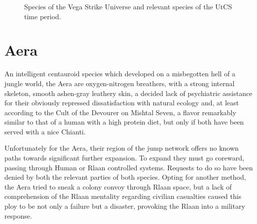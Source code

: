 \label{appendix:Species}

\begin{figure} \begin{center}
    \caption{Species of the Vega Strike Universe and relevant species of the UtCS time period.}
    \label{fig:vs-species}
\end{center} \end{figure}


\section{Aera}

 An intelligent centauroid species which developed on a misbegotten
hell of a jungle world, the Aera are oxygen-nitrogen breathers, with a
strong internal skeleton, smooth ashen-gray leathery skin, a decided
lack of psychiatric assistance for their obviously repressed
dissatisfaction with natural ecology and, at least according to the
Cult of the Devourer on Mishtal Seven, a flavor remarkably similar to
that of a human with a high protein diet, but only if both have been
served with a nice Chianti.

Unfortunately for the Aera, their region of the jump network offers no
known paths towards significant further expansion. To expand they must
go coreward, passing through Human or Rlaan controlled
systems. Requests to do so have been denied by both the relevant
parties of both species. Opting for another method, the Aera tried to
sneak a colony convoy through Rlaan space, but a lack of comprehension
of the Rlaan mentality regarding civilian casualties caused this ploy
to be not only a failure but a disaster, provoking the Rlaan into a
military response.


